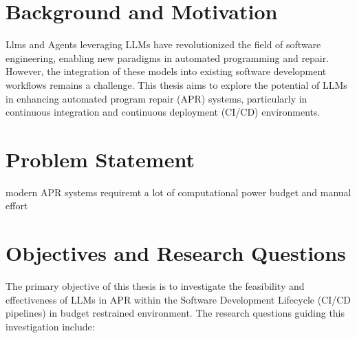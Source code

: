 \section{Background and Motivation}
Llms and Agents leveraging LLMs have revolutionized the field of software engineering, enabling new paradigms in automated programming and repair. However, the integration of these models into existing software development workflows remains a challenge. This thesis aims to explore the potential of LLMs in enhancing automated program repair (APR) systems, particularly in continuous integration and continuous deployment (CI/CD) environments.
\section{Problem Statement}
modern APR systems requiremt a lot of computational power budget and manual effort \cite{puvvadiCodingAgentsComprehensive2025}

\section{Objectives and Research Questions}
The primary objective of this thesis is to investigate the feasibility and effectiveness of LLMs in APR within the Software Development Lifecycle (CI/CD pipelines) in budget restrained environment. The research questions guiding this investigation include:
